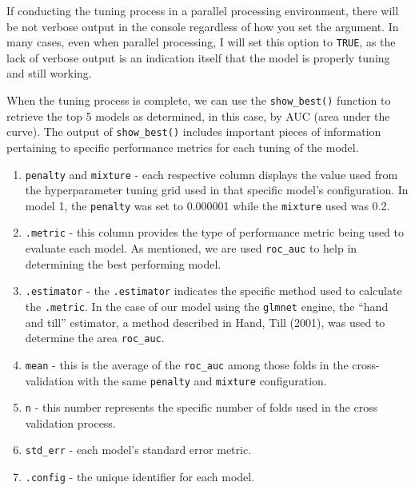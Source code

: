 \documentclass[
  letterpaper,
]{krantz}
\providecommand{\tightlist}{%
  \setlength{\itemsep}{0pt}\setlength{\parskip}{0pt}}\usepackage{longtable,booktabs,array}
\begin{document}
\begin{tcolorbox}[enhanced jigsaw, left=2mm, toprule=.15mm, opacitybacktitle=0.6, leftrule=.75mm, bottomrule=.15mm, colbacktitle=quarto-callout-note-color!10!white, breakable, colback=white, bottomtitle=1mm, toptitle=1mm, title=\textcolor{quarto-callout-note-color}{\faInfo}\hspace{0.5em}{Note}, coltitle=black, titlerule=0mm, arc=.35mm, opacityback=0, colframe=quarto-callout-note-color-frame, rightrule=.15mm]

If conducting the tuning process in a parallel processing environment,
there will be not verbose output in the console regardless of how you
set the argument. In many cases, even when parallel processing, I will
set this option to \texttt{TRUE}, as the lack of verbose output is an
indication itself that the model is properly tuning and still working.

\end{tcolorbox}

When the tuning process is complete, we can use the
\texttt{show\_best()} function to retrieve the top 5 models as
determined, in this case, by AUC (area under the curve). The output of
\texttt{show\_best()} includes important pieces of information
pertaining to specific performance metrics for each tuning of the model.

\begin{enumerate}
\def\labelenumi{\arabic{enumi}.}
\tightlist
\item
  \texttt{penalty} and \texttt{mixture} - each respective column
  displays the value used from the hyperparameter tuning grid used in
  that specific model's configuration. In model 1, the \texttt{penalty}
  was set to 0.000001 while the \texttt{mixture} used was 0.2.
\item
  \texttt{.metric} - this column provides the type of performance metric
  being used to evaluate each model. As mentioned, we are used
  \texttt{roc\_auc} to help in determining the best performing model.
\item
  \texttt{.estimator} - the \texttt{.estimator} indicates the specific
  method used to calculate the \texttt{.metric}. In the case of our
  model using the \texttt{glmnet} engine, the ``hand and till''
  estimator, a method described in Hand, Till (2001), was used to
  determine the area \texttt{roc\_auc}.
\item
  \texttt{mean} - this is the average of the \texttt{roc\_auc} among
  those folds in the cross-validation with the same \texttt{penalty} and
  \texttt{mixture} configuration.
\item
  \texttt{n} - this number represents the specific number of folds used
  in the cross validation process.
\item
  \texttt{std\_err} - each model's standard error metric.
\item
  \texttt{.config} - the unique identifier for each model.
\end{enumerate}
\end{document}
